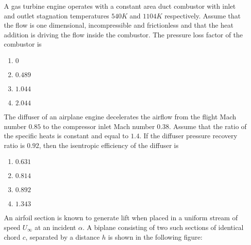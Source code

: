 	\item A gas turbine engine operates with a constant area duct combustor with inlet and outlet stagnation temperatures $540 K$ and $1104 K$ respectively. Assume that the flow is one dimensional, incompressible and frictionless and that the heat addition is driving the flow inside the combustor. The pressure loss factor  of the combustor is
		\begin{enumerate}
			\item $ 0$
			\item $0.489$
			\item $1.044$
			\item $2.044$
		\end{enumerate}
	\item The diffuser of an airplane engine decelerates the airflow from the flight Mach number $0.85$ to the compressor inlet Mach number $0.38$. Assume that the ratio of the specific heats is constant and equal to $1.4$. If the diffuser pressure recovery ratio is $0.92$, then the isentropic efficiency of the diffuser is
		\begin{enumerate}
			\item $0.631$
			\item $0.814$
			\item $0.892$
			\item $1.343$
		\end{enumerate}
	\item An airfoil section is known to generate lift when placed in a uniform stream of speed $U_{\infty}$ at an incident $\alpha$. A biplane consisting of two such sections of identical chord $c$, separated by a distance $h$ is shown in the following figure:
		\begin{figure}[h!]
			
		\end{figure}


